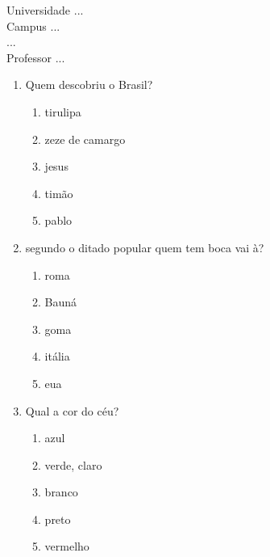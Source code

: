\documentclass[10pt,a4paper,twocolumn]{report}
\begin{document}
\begin{flushleft}
Universidade ...\\
Campus ...\\
...\\
Professor ...\\
\end{flushleft}




 \begin{enumerate} 
    \item  Quem descobriu o Brasil?





    \begin{enumerate}
    \item  tirulipa

\item  zeze de camargo

\item  jesus

\item  timão

\item  pablo


    \end{enumerate} 
    \item  segundo o ditado popular quem tem boca vai à?





    \begin{enumerate}
    \item  roma

\item  Bauná

\item  goma

\item  itália

\item  eua


    \end{enumerate} 
    \item  Qual a cor do céu?





    \begin{enumerate}
    \item  azul

\item  verde, claro

\item  branco

\item  preto

\item  vermelho


    \end{enumerate}\end{enumerate} 
\end{document}
